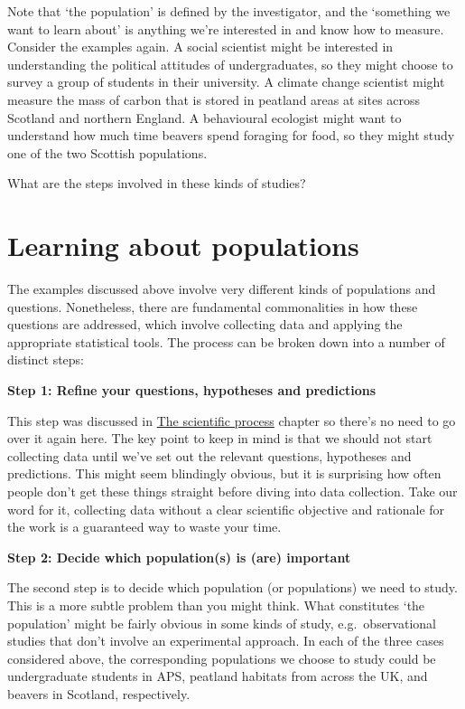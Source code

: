 \documentclass[]{book}
\begin{document}
Note that `the population' is defined by the investigator, and the
`something we want to learn about' is anything we're interested in and
know how to measure. Consider the examples again. A social scientist
might be interested in understanding the political attitudes of
undergraduates, so they might choose to survey a group of students in
their university. A climate change scientist might measure the mass of
carbon that is stored in peatland areas at sites across Scotland and
northern England. A behavioural ecologist might want to understand how
much time beavers spend foraging for food, so they might study one of
the two Scottish populations.

What are the steps involved in these kinds of studies?

\section{Learning about populations}\label{learning-about-populations}

The examples discussed above involve very different kinds of populations
and questions. Nonetheless, there are fundamental commonalities in how
these questions are addressed, which involve collecting data and
applying the appropriate statistical tools. The process can be broken
down into a number of distinct steps:

\textbf{Step 1: Refine your questions, hypotheses and predictions}

This step was discussed in
\protect\hyperlink{the-scientific-process}{The scientific process}
chapter so there's no need to go over it again here. The key point to
keep in mind is that we should not start collecting data until we've set
out the relevant questions, hypotheses and predictions. This might seem
blindingly obvious, but it is surprising how often people don't get
these things straight before diving into data collection. Take our word
for it, collecting data without a clear scientific objective and
rationale for the work is a guaranteed way to waste your time.

\textbf{Step 2: Decide which population(s) is (are) important}

The second step is to decide which population (or populations) we need
to study. This is a more subtle problem than you might think. What
constitutes `the population' might be fairly obvious in some kinds of
study, e.g.~observational studies that don't involve an experimental
approach. In each of the three cases considered above, the corresponding
populations we choose to study could be undergraduate students in APS,
peatland habitats from across the UK, and beavers in Scotland,
respectively.
\end{document}
